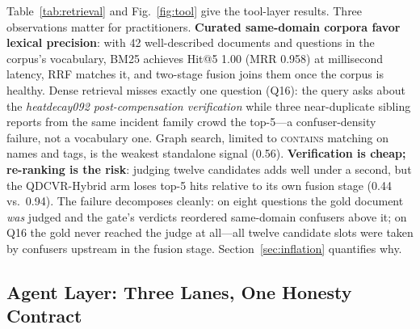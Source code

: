 \documentclass[journal]{IEEEtran}
\begin{document}
Table~\ref{tab:retrieval} and Fig.~\ref{fig:tool} give the tool-layer
results. Three observations matter for practitioners. \textbf{Curated
same-domain corpora favor lexical precision}: with 42 well-described
documents and questions in the corpus's vocabulary, BM25 achieves Hit@5
1.00 (MRR 0.958) at millisecond latency, RRF matches it, and two-stage
fusion joins them once the corpus is healthy. Dense retrieval misses
exactly one question (Q16): the query asks about the
\emph{heatdecay092 post-compensation verification} while three
near-duplicate sibling reports from the same incident family crowd the
top-5---a confuser-density failure, not a vocabulary one. Graph search,
limited to \textsc{contains} matching on names and tags, is the weakest
standalone signal (0.56). \textbf{Verification is cheap; re-ranking is
the risk}: judging twelve candidates adds well under a second, but the
QDCVR-Hybrid arm loses top-5 hits relative to its own fusion stage
(0.44 vs.\ 0.94). The failure decomposes cleanly: on eight questions the
gold document \emph{was} judged and the gate's verdicts reordered
same-domain confusers above it; on Q16 the gold never reached the judge
at all---all twelve candidate slots were taken by confusers upstream in
the fusion stage. Section~\ref{sec:inflation} quantifies why.

\subsection{Agent Layer: Three Lanes, One Honesty Contract}
\label{sec:agentic}
\end{document}
